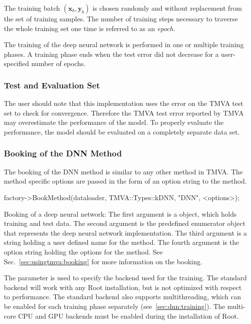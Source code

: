 The training batch $(\mathbf{x}_b,\mathbf{y}_b)$ is chosen randomly
and without replacement from the set of training samples. The number
of training steps necessary to traverse the whole training set one time is
referred to as an \textit{epoch}.

The training of the deep neural network is performed in one or
multiple training phases. A training phase ends when the test error
did not decrease for a user-specified number of epochs.

\subsubsection{Test and Evaluation Set}
\label{sec:dnn_test_and_evaluation_set}

The user should note that this implementation uses the error on the TMVA test set
to check for convergence. Therefore the TMVA test error reported by TMVA may
overestimate the performance of the model. To properly evaluate the performance, the
model should be evaluated on a completely separate data set.

\subsubsection{Booking of the DNN Method}

The booking of the DNN method is similar to any other method in TMVA. The method
specific options are passed in the form of an option string  to
the method.

\begin{codeexample}
\begin{tmvacode}
factory->BookMethod(dataloader, TMVA::Types::kDNN, "DNN", <options>);
\end{tmvacode}
\caption[.]{\codeexampleCaptionSize Booking of a deep neural network:
 The first argument is a  object, which holds training and test
 data. The second argument is the predefined enumerator object that represents
 the deep neural network implementation. The third argument is a string holding
 a user defined name for the method. The fourth argument is the option string
 holding the options for the method. See Sec.~\ref{sec:usingtmva:booking}
 for more information on the booking.}
\label{example:DNN_booking}
\end{codeexample}

The  parameter is used to specify the backend used for the
training. The standard backend will work with any Root installation, but
is not optimized with respect to performance. The standard backend also
supports multithreading, which can be enabled for each training phase
separately (see~\ref{sec:dnn:training}). The multi-core CPU and GPU backends
 must be enabled during the installation of Root.

